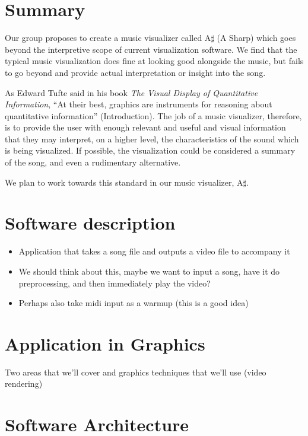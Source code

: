 \documentclass{article}
\begin{document}
\section{Summary}

Our group proposes to create a music visualizer called A$\sharp$ (A Sharp) which goes beyond the interpretive scope of current visualization software.  We find that the typical music visualization does fine at looking good alongside the music, but fails to go beyond and provide actual interpretation or insight into the song.

As Edward Tufte said in his book \textit{The Visual Display of Quantitative Information}, ``At their best, graphics are instruments for reasoning about quantitative information'' (Introduction).  The job of a music visualizer, therefore, is to provide the user with enough relevant and useful and visual information that they may interpret, on a higher level, the characteristics of the sound which is being visualized.  If possible, the visualization could be considered a summary of the song, and even a rudimentary alternative.

We plan to work towards this standard in our music visualizer, A$\sharp$.

\section{Software description}

\begin{itemize}
	\item Application that takes a song file and outputs a video file to accompany it
	\item We should think about this, maybe we want to input a song, have it do preprocessing, and then immediately play the video?
	\item Perhaps also take midi input as a warmup (this is a good idea)
\end{itemize}

\section{Application in Graphics}

Two areas that we'll cover and graphics techniques that we'll use (video rendering)

\section{Software Architecture}
\end{document}
